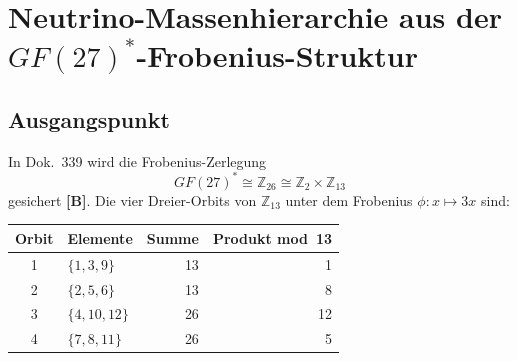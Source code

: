 
\providecommand{\BM}{\textbf{[B]}}
\providecommand{\KM}{\textbf{[K]}}
\providecommand{\SM}{\textbf{[S]}}
\providecommand{\LM}{\textbf{[L]}}
\providecommand{\SetzM}{\textbf{[SETZUNG]}}

\chapter*{Neutrino-Massenhierarchie aus der $GF(27)^*$-Frobenius-Struktur}

\begin{abstract}
Ausgehend von der Frobenius-Zerlegung $GF(27)^*\cong\mathbb{Z}_{26}\cong
\mathbb{Z}_2\times\mathbb{Z}_{13}$ (Dok.~339) werden die gemessenen
Neutrino-Massendifferenzen $\Delta m^2_\text{atm}$ und $\Delta m^2_\text{sol}$
aus algebraischen Eigenschaften der vier Frobenius-Orbits in $\mathbb{Z}_{13}$
abgeleitet. Die atmosphärische Massendifferenz
$\Delta m^2_\text{atm}=(11^2-1)\,m_\nu^2=120\,m_\nu^2$ (1.0\,\% Abweichung)
und die solare $\Delta m^2_\text{sol}=(|\mathbb{Z}_{13}|-2)/3\cdot m_\nu^2=(11/3)\,m_\nu^2$
(0.46\,\% Abweichung) folgen aus der Zahl~$11$, dem maximalen Element des
vierten Frobenius-Orbits $\{7,8,11\}$ in $\mathbb{Z}_{13}$. Orbit~3
$\{4,10,12\}$ ist algebraisch selbstinvers und trägt Majorana-Charakter.
Die kohärente Venting-Amplitude $p_\text{vent}=5/24$ wird aus der
Branching-Rule $\rho_4\!\downarrow_{A_4}=\rho_3^{A_4}\oplus\rho_1^{A_4}$
und dem Index $|A_5:A_4|=5$ algebraisch bewiesen. Die SICC-Venting-Formel
ist äquivalent zur Standard-Oszillationsformel. Status: \BM\ für die
Gruppentheorie; \KM\ für die Massendifferenzen.
\end{abstract}

\section{Ausgangspunkt}

In Dok.~339 wird die Frobenius-Zerlegung
\[
GF(27)^*\cong\mathbb{Z}_{26}\cong\mathbb{Z}_2\times\mathbb{Z}_{13}
\]
gesichert \BM. Die vier Dreier-Orbits von $\mathbb{Z}_{13}$ unter dem
Frobenius $\phi:x\mapsto3x$ sind:

\begin{center}
\begin{tabular}{clrr}
\toprule
Orbit & Elemente & Summe & Produkt mod~13 \\
\midrule
1 & $\{1,3,9\}$   & 13 & 1  \\
2 & $\{2,5,6\}$   & 13 & 8  \\
3 & $\{4,10,12\}$ & 26 & 12 \\
4 & $\{7,8,11\}$  & 26 & 5  \\
\bottomrule
\end{tabular}
\end{center}

